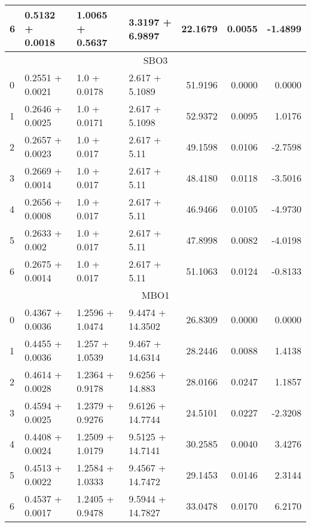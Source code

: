\begin{tabular}{llllrrr}
  6 &  0.5132 + 0.0018 &  1.0065 + 0.5637 &  3.3197 + 6.9897 &             22.1679 &                 0.0055 &        -1.4899 \\
  \midrule
  \multicolumn{7}{c}{SBO3} \\
  \midrule
  0 &  0.2551 + 0.0021 &  1.0 + 0.0178 &  2.617 + 5.1089 &             51.9196 &                 0.0000 &         0.0000 \\
  1 &  0.2646 + 0.0025 &  1.0 + 0.0171 &  2.617 + 5.1098 &             52.9372 &                 0.0095 &         1.0176 \\
  2 &  0.2657 + 0.0023 &   1.0 + 0.017 &    2.617 + 5.11 &             49.1598 &                 0.0106 &        -2.7598 \\
  3 &  0.2669 + 0.0014 &   1.0 + 0.017 &    2.617 + 5.11 &             48.4180 &                 0.0118 &        -3.5016 \\
  4 &  0.2656 + 0.0008 &   1.0 + 0.017 &    2.617 + 5.11 &             46.9466 &                 0.0105 &        -4.9730 \\
  5 &   0.2633 + 0.002 &   1.0 + 0.017 &    2.617 + 5.11 &             47.8998 &                 0.0082 &        -4.0198 \\
  6 &  0.2675 + 0.0014 &   1.0 + 0.017 &    2.617 + 5.11 &             51.1063 &                 0.0124 &        -0.8133 \\
  \midrule
  \multicolumn{7}{c}{MBO1} \\
  \midrule
  0 &  0.4367 + 0.0036 &  1.2596 + 1.0474 &  9.4474 + 14.3502 &             26.8309 &                 0.0000 &         0.0000 \\
  1 &  0.4455 + 0.0036 &   1.257 + 1.0539 &   9.467 + 14.6314 &             28.2446 &                 0.0088 &         1.4138 \\
  2 &  0.4614 + 0.0028 &  1.2364 + 0.9178 &   9.6256 + 14.883 &             28.0166 &                 0.0247 &         1.1857 \\
  3 &  0.4594 + 0.0025 &  1.2379 + 0.9276 &  9.6126 + 14.7744 &             24.5101 &                 0.0227 &        -2.3208 \\
  4 &  0.4408 + 0.0024 &  1.2509 + 1.0179 &  9.5125 + 14.7141 &             30.2585 &                 0.0040 &         3.4276 \\
  5 &  0.4513 + 0.0022 &  1.2584 + 1.0333 &  9.4567 + 14.7472 &             29.1453 &                 0.0146 &         2.3144 \\
  6 &  0.4537 + 0.0017 &  1.2405 + 0.9478 &  9.5944 + 14.7827 &             33.0478 &                 0.0170 &         6.2170 \\

\end{tabular}
